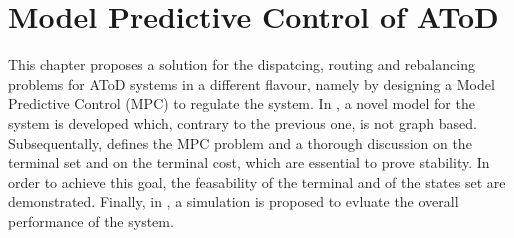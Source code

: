 \chapter{Model Predictive Control of AToD}\label{ch:mpc}
This chapter proposes a solution for the dispatcing, routing and rebalancing problems for AToD systems in a different flavour, namely by designing a Model Predictive Control (MPC) to regulate the system. In , a novel model for the system is developed which, contrary to the previous one, is not graph based. Subsequentally,  defines the MPC problem and a thorough discussion on the terminal set and on the terminal cost, which are essential to prove stability. In order to achieve this goal, the feasability of the terminal and of the states set are demonstrated. Finally, in , a simulation is proposed to evluate the overall performance of the system. 
